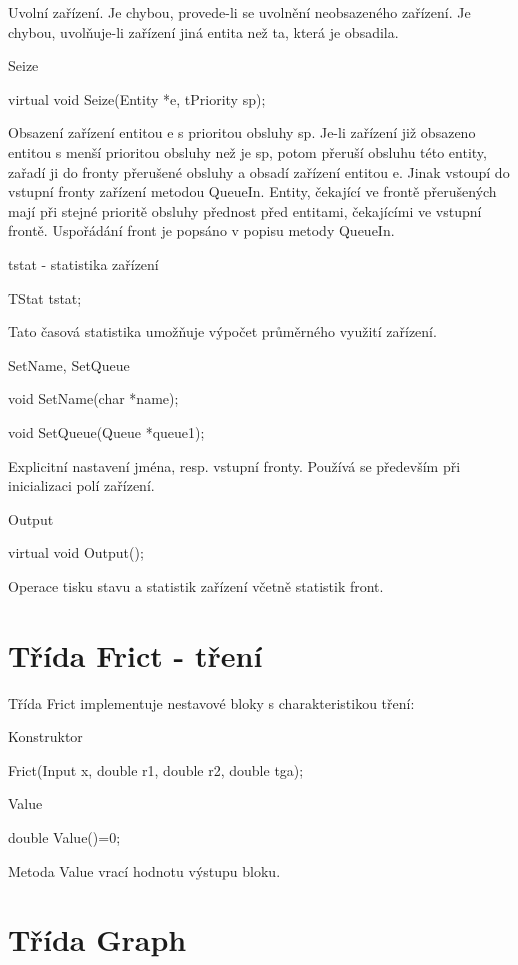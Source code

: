 \documentclass[a4paper]{article}
\begin{document}
Uvolní zařízení. Je chybou, provede-li se uvolnění neobsazeného zařízení.
Je chybou, uvolňuje-li zařízení jiná entita než ta, která je obsadila.


Seize

  virtual void Seize(Entity *e, tPriority sp);


Obsazení zařízení entitou e s prioritou obsluhy sp.
Je-li zařízení již obsazeno entitou s menší prioritou obsluhy než
je sp, potom přeruší obsluhu této entity, zařadí ji do fronty
přerušené obsluhy a obsadí zařízení entitou e. Jinak vstoupí
do vstupní fronty zařízení metodou QueueIn. Entity, čekající
ve frontě přerušených mají při stejné prioritě obsluhy přednost před
entitami, čekajícími ve vstupní frontě. Uspořádání front je popsáno
v popisu metody QueueIn.


tstat - statistika zařízení

  TStat tstat;


Tato časová statistika umožňuje výpočet průměrného využití zařízení.


SetName, SetQueue

  void SetName(char *name);

  void SetQueue(Queue *queue1);


Explicitní nastavení jména, resp. vstupní fronty. Používá se především
při inicializaci polí zařízení.


Output

  virtual void Output();


Operace tisku stavu a statistik zařízení včetně statistik front.



\section{Třída Frict - tření}

Třída Frict implementuje nestavové bloky s charakteristikou tření:


Konstruktor

  Frict(Input x, double r1, double r2, double tga);



Value

  double Value()=0;


Metoda Value vrací hodnotu výstupu bloku.

\section{Třída Graph}
\end{document}
